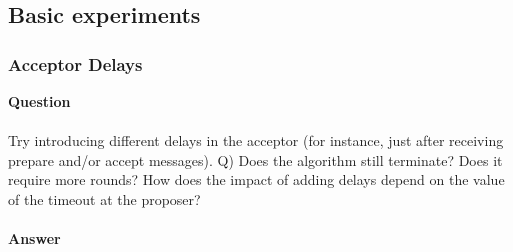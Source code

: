 \documentclass[a4paper, 10pt]{article}
\begin{document}
\subsection{Basic experiments}

\subsubsection{Acceptor Delays}
\textbf{\large{Question}}\\\\

Try introducing different delays in the acceptor (for instance, just after receiving prepare and/or accept messages). Q) Does the algorithm still terminate? Does it require more rounds? How does the impact of adding delays depend on the value of the timeout at the proposer? 
\\\\
\textbf{\large{Answer}}\\\\
\end{document}
